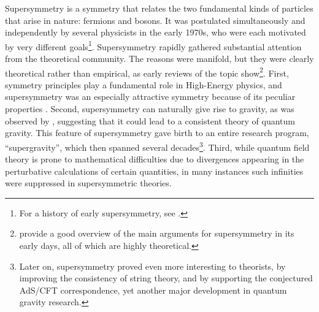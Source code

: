 \documentclass[smallextended]{svjour3}
\begin{document}
Supersymmetry is a symmetry that relates the two fundamental kinds of particles that arise in nature: fermions and bosons. It was postulated simultaneously and independently by several physicists in the early 1970s, who were each motivated by very different goals\footnote{%
For a history of early supersymmetry, see \citealt{kane2000the}.}. Supersymmetry rapidly gathered substantial attention from the theoretical community. The reasons were manifold, but they were clearly theoretical rather than empirical, as early reviews of the topic show\footnote{\citealt{Fayet1976cr,Freedman1978zi,Taylor1983su} provide a good overview of the main arguments for supersymmetry in its early days, all of which are highly theoretical.}. First, symmetry principles play a fundamental role in High-Energy physics, and supersymmetry was an especially attractive symmetry because of its peculiar properties%
. Second, supersymmetry can naturally give rise to gravity, as was observed by \citet{Volkov1973}, suggesting that it could lead to a consistent theory of quantum gravity. This feature of supersymmetry gave birth to an entire research program, ``supergravity'', which then spanned several decades\footnote{Later on, supersymmetry proved even more interesting to theorists, by improving the consistency of string theory, and by supporting the conjectured AdS/CFT correspondence, yet another major development in quantum gravity research.}. Third, while quantum field theory is prone to mathematical difficulties due to divergences appearing in the perturbative calculations of certain quantities, in many instances such infinities were suppressed in supersymmetric theories.%
\end{document}
